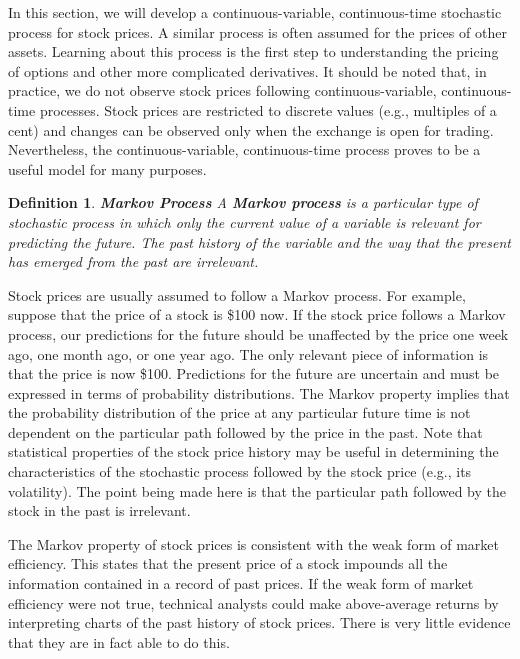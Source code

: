 \documentclass[letterpaper,10pt]{article}
\newtheorem{df}{Definition}[section]
\begin{document}
\noindent In this section, we will develop a continuous-variable, continuous-time stochastic process for stock prices. A similar process is often assumed for the prices of other assets. Learning about this process is the first step to understanding the pricing of options and other more complicated derivatives. It should be noted that, in practice, we do not observe stock prices following continuous-variable, continuous-time processes. Stock prices are restricted to discrete values (e.g., multiples of a cent) and changes can be observed only when the exchange is open for trading. Nevertheless, the continuous-variable, continuous-time process proves to be a useful model for many purposes.

\begin{df}{\bf Markov Process}
A {\bf Markov process} is a particular type of stochastic process in which only the current value of a variable is relevant for predicting the future. The past history of the variable and the way that the present has emerged from the past are irrelevant.
\end{df}

\noindent Stock prices are usually assumed to follow a Markov process. For example, suppose that the price of a stock is \$100 now. If the stock price follows a Markov process, our predictions for the future should be unaffected by the price one week ago, one month ago, or one year ago. The only relevant piece of information is that the price is now \$100. Predictions for the future are uncertain and must be expressed in terms of probability distributions. The Markov property implies that the probability distribution of the price at any particular future time is not dependent on the particular path followed by the price in the past.  Note that statistical properties of the stock price history may be useful in determining the characteristics of the stochastic process followed by the stock price (e.g., its volatility). The point being made here is that the particular path followed by the stock in the past is irrelevant.

The Markov property of stock prices is consistent with the weak form of market efficiency. This states that the present price of a stock impounds all the information contained in a record of past prices. If the weak form of market efficiency were not true, technical analysts could make above-average returns by interpreting charts of the past history of stock prices. There is very little evidence that they are in fact able to do this.
\end{document}
